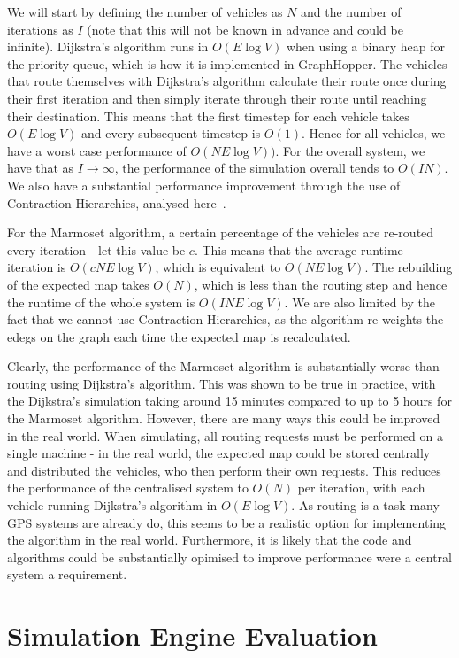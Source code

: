 \documentclass[ %
                    author={Alexander Hill},
                supervisor={Dr. Benjamin Sach},
                    degree={MEng},
                     title={MARMOSET},
                  subtitle={Multi-Agent Route Management using Online Simulation for Efficient Transportation},
                      type={research},
                      year={2016} ]{dissertation}
\begin{document}
We will start by defining the number of vehicles as $N$ and the number of
iterations as $I$ (note that this will not be known in advance and could be
infinite). Dijkstra's algorithm runs in $O(E \log V)$ when using a binary heap for the
priority queue, which is how it is implemented in GraphHopper. The vehicles that
route themselves with Dijkstra's algorithm calculate their route once during
their first iteration and then simply iterate through their route until reaching
their destination. This means that the first timestep for each vehicle takes
$O(E\log V)$ and every subsequent timestep is $O(1)$. Hence for all vehicles, we
have a worst case performance of $O(NE\log V))$. For the overall system, we
have that as $I \rightarrow \infty$, the performance of the simulation overall
tends to $O(IN)$. We also have a substantial performance improvement through the
use of Contraction Hierarchies, analysed here~\cite{ch-complexity}.

For the Marmoset algorithm, a certain percentage of the vehicles are re-routed
every iteration - let this value be $c$. This means that the average runtime
iteration is $O(cNE\log V)$, which is equivalent to $O(NE \log V)$. The
rebuilding of the expected map takes $O(N)$, which is less than the routing step
and hence the runtime of the whole system is $O(INE\log V)$. We are also
limited by the fact that we cannot use Contraction Hierarchies, as the algorithm
re-weights the edegs on the graph each time the expected map is recalculated.

Clearly, the performance of the Marmoset algorithm is substantially worse than routing
using Dijkstra's algorithm. This was shown to be true in practice, with the
Dijkstra's simulation taking around 15 minutes compared to up to 5 hours for
the Marmoset algorithm. However, there are many ways this could be improved in
the real world. When simulating, all routing requests must be performed on a
single machine - in the real world, the expected map could be stored centrally
and distributed the vehicles, who then perform their own requests. This reduces
the performance of the centralised system to $O(N)$ per iteration, with each
vehicle running Dijkstra's algorithm in $O(E\log V)$. As routing is a task
many GPS systems are already do, this seems to be a realistic option for
implementing the algorithm in the real world. Furthermore, it is likely that the
code and algorithms could be substantially opimised to improve performance were
a central system a requirement.

\section{Simulation Engine Evaluation}
\end{document}
